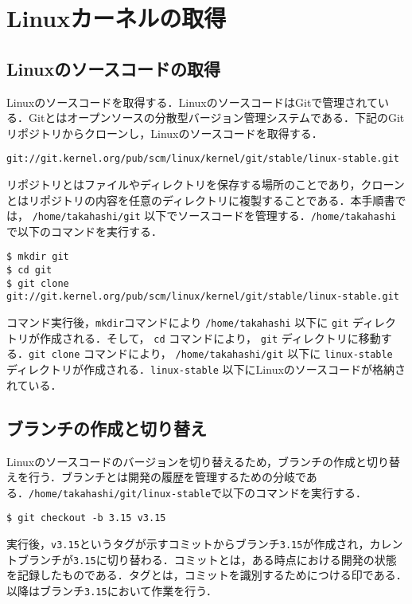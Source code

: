 \documentclass[12pt]{jsarticle}
\begin{document}
\newpage
\section{Linuxカーネルの取得}
\label{sec:getkernel}
\subsection{Linuxのソースコードの取得}
Linuxのソースコードを取得する．LinuxのソースコードはGitで管理されている．Gitとはオープンソースの分散型バージョン管理システムである．下記のGitリポジトリからクローンし，Linuxのソースコードを取得する．

\begin{verbatim}
git://git.kernel.org/pub/scm/linux/kernel/git/stable/linux-stable.git
\end{verbatim}
リポジトリとはファイルやディレクトリを保存する場所のことであり，クローンとはリポジトリの内容を任意のディレクトリに複製することである．本手順書では， \verb|/home/takahashi/git| 以下でソースコードを管理する．\verb|/home/takahashi| で以下のコマンドを実行する．

\begin{verbatim}
$ mkdir git
$ cd git
$ git clone git://git.kernel.org/pub/scm/linux/kernel/git/stable/linux-stable.git
\end{verbatim}
コマンド実行後，\verb|mkdir|コマンドにより \verb|/home/takahashi| 以下に \verb|git| ディレクトリが作成される．そして， \verb|cd| コマンドにより， \verb|git| ディレクトリに移動する．\verb|git clone| コマンドにより， \verb|/home/takahashi/git| 以下に \verb|linux-stable| ディレクトリが作成される．\verb|linux-stable| 以下にLinuxのソースコードが格納されている．

\subsection{ブランチの作成と切り替え}
Linuxのソースコードのバージョンを切り替えるため，ブランチの作成と切り替えを行う．ブランチとは開発の履歴を管理するための分岐である．\verb|/home/takahashi/git/linux-stable|で以下のコマンドを実行する．

\begin{verbatim}
$ git checkout -b 3.15 v3.15
\end{verbatim}
実行後，\verb|v3.15|というタグが示すコミットからブランチ\verb|3.15|が作成され，カレントブランチが\verb|3.15|に切り替わる．コミットとは，ある時点における開発の状態を記録したものである．タグとは，コミットを識別するためにつける印である．以降はブランチ\verb|3.15|において作業を行う．
\end{document}
